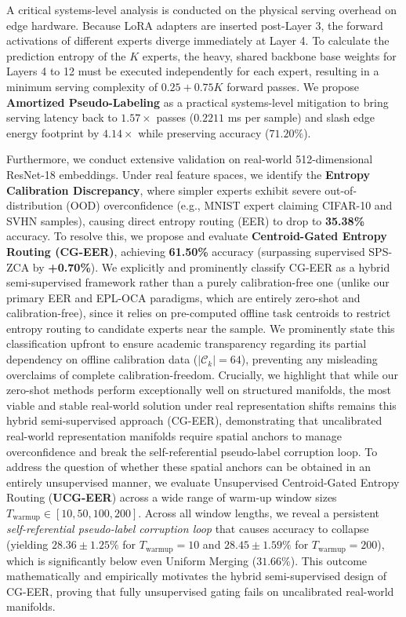 A critical systems-level analysis is conducted on the physical serving overhead on edge hardware. Because LoRA adapters are inserted post-Layer 3, the forward activations of different experts diverge immediately at Layer 4. To calculate the prediction entropy of the $K$ experts, the heavy, shared backbone base weights for Layers 4 to 12 must be executed independently for each expert, resulting in a minimum serving complexity of $0.25 + 0.75 K$ forward passes. We propose \textbf{Amortized Pseudo-Labeling} as a practical systems-level mitigation to bring serving latency back to $1.57\times$ passes ($0.2211$ ms per sample) and slash edge energy footprint by $4.14\times$ while preserving accuracy ($71.20\%$).

Furthermore, we conduct extensive validation on real-world 512-dimensional ResNet-18 embeddings. Under real feature spaces, we identify the \textbf{Entropy Calibration Discrepancy}, where simpler experts exhibit severe out-of-distribution (OOD) overconfidence (e.g., MNIST expert claiming CIFAR-10 and SVHN samples), causing direct entropy routing (EER) to drop to \textbf{35.38\%} accuracy. To resolve this, we propose and evaluate \textbf{Centroid-Gated Entropy Routing (CG-EER)}, achieving \textbf{61.50\%} accuracy (surpassing supervised SPS-ZCA by \textbf{+0.70\%}). We explicitly and prominently classify CG-EER as a hybrid semi-supervised framework rather than a purely calibration-free one (unlike our primary EER and EPL-OCA paradigms, which are entirely zero-shot and calibration-free), since it relies on pre-computed offline task centroids to restrict entropy routing to candidate experts near the sample. We prominently state this classification upfront to ensure academic transparency regarding its partial dependency on offline calibration data ($|\mathcal{C}_k|=64$), preventing any misleading overclaims of complete calibration-freedom. Crucially, we highlight that while our zero-shot methods perform exceptionally well on structured manifolds, the most viable and stable real-world solution under real representation shifts remains this hybrid semi-supervised approach (CG-EER), demonstrating that uncalibrated real-world representation manifolds require spatial anchors to manage overconfidence and break the self-referential pseudo-label corruption loop. To address the question of whether these spatial anchors can be obtained in an entirely unsupervised manner, we evaluate Unsupervised Centroid-Gated Entropy Routing (\textbf{UCG-EER}) across a wide range of warm-up window sizes $T_{\text{warmup}} \in [10, 50, 100, 200]$. Across all window lengths, we reveal a persistent \emph{self-referential pseudo-label corruption loop} that causes accuracy to collapse (yielding $28.36 \pm 1.25\%$ for $T_{\text{warmup}}=10$ and $28.45 \pm 1.59\%$ for $T_{\text{warmup}}=200$), which is significantly below even Uniform Merging ($31.66\%$). This outcome mathematically and empirically motivates the hybrid semi-supervised design of CG-EER, proving that fully unsupervised gating fails on uncalibrated real-world manifolds.

